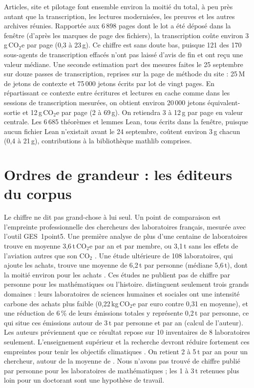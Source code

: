 \documentclass[11pt,a4paper]{article}
\begin{document}
Articles, site et pilotage font ensemble environ la moitié du total, à peu près autant que la transcription, les lectures modernisées, les preuves et les autres archives réunies. Rapportée aux 6\,898 pages dont le lot a été déposé dans la fenêtre (d'après les marques de page des fichiers), la transcription coûte environ 3\,g\,CO$_2$e par page (0,3 à 23\,g). Ce chiffre est sans doute bas, puisque 121 des 170 sous-agents de transcription effacés n'ont pas laissé d'avis de fin et ont reçu une valeur médiane. Une seconde estimation part des mesures faites le 25 septembre sur douze passes de transcription, reprises sur la page de méthode du site : 25\,M de jetons de contexte et 75\,000 jetons écrits par lot de vingt pages. En répartissant ce contexte entre écritures et lectures en cache comme dans les sessions de transcription mesurées, on obtient environ 20\,000 jetons équivalent-sortie et 12\,g\,CO$_2$e par page (2 à 69\,g). On retiendra 3 à 12\,g par page en valeur centrale. Les 6\,685 théorèmes et lemmes Lean, tous écrits dans la fenêtre, puisque aucun fichier Lean n'existait avant le 24 septembre, coûtent environ 3\,g chacun (0,4 à 21\,g), contributions à la bibliothèque mathlib comprises.

\section{Ordres de grandeur : les éditeurs du corpus}

Le chiffre ne dit pas grand-chose à lui seul. Un point de comparaison est l'empreinte professionnelle des chercheurs des laboratoires français, mesurée avec l'outil GES~1point5. Une première analyse de plus d'une centaine de laboratoires trouve en moyenne 3,6\,t\,CO$_2$e par an et par membre, ou 3,1\,t sans les effets de l'aviation autres que son CO$_2$ \citep{mariette2022}. Une étude ultérieure de 108 laboratoires, qui ajoute les achats, trouve une moyenne de 6,2\,t par personne (médiane 5,6\,t), dont la moitié environ pour les achats \citep{depaepe2024}. Ces études ne publient pas de chiffre par personne pour les mathématiques ou l'histoire. \citet{depaepe2024} distinguent seulement trois grands domaines : leurs laboratoires de sciences humaines et sociales ont une intensité carbone des achats plus faible (0,22\,kg\,CO$_2$e par euro contre 0,31 en moyenne), et une réduction de 6\,\% de leurs émissions totales y représente 0,2\,t par personne, ce qui situe ces émissions autour de 3\,t par personne et par an (calcul de l'auteur). Les auteurs préviennent que ce résultat repose sur 10 inventaires de 8 laboratoires seulement. L'enseignement supérieur et la recherche devront réduire fortement ces empreintes pour tenir les objectifs climatiques \citep{ligozat2024targets}. On retient 2 à 5\,t par an pour un chercheur, autour de la moyenne de \citet{mariette2022}. Nous n'avons pas trouvé de chiffre publié par personne pour les laboratoires de mathématiques ; les 1 à 3\,t retenues plus loin pour un doctorant sont une hypothèse de travail.
\end{document}
